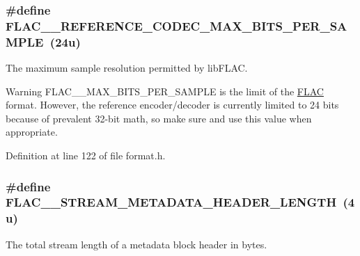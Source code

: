\subsubsection[{\texorpdfstring{F\+L\+A\+C\+\_\+\+\_\+\+R\+E\+F\+E\+R\+E\+N\+C\+E\+\_\+\+C\+O\+D\+E\+C\+\_\+\+M\+A\+X\+\_\+\+B\+I\+T\+S\+\_\+\+P\+E\+R\+\_\+\+S\+A\+M\+P\+LE}{FLAC__REFERENCE_CODEC_MAX_BITS_PER_SAMPLE}}]{\setlength{\rightskip}{0pt plus 5cm}\#define F\+L\+A\+C\+\_\+\+\_\+\+R\+E\+F\+E\+R\+E\+N\+C\+E\+\_\+\+C\+O\+D\+E\+C\+\_\+\+M\+A\+X\+\_\+\+B\+I\+T\+S\+\_\+\+P\+E\+R\+\_\+\+S\+A\+M\+P\+LE~(24u)}\hypertarget{group__flac__format_ga0fc418d96053d385fd2f56dce8007fbc}{}\label{group__flac__format_ga0fc418d96053d385fd2f56dce8007fbc}
The maximum sample resolution permitted by lib\+F\+L\+AC.

\begin{DoxyWarning}{Warning}
F\+L\+A\+C\+\_\+\+\_\+\+M\+A\+X\+\_\+\+B\+I\+T\+S\+\_\+\+P\+E\+R\+\_\+\+S\+A\+M\+P\+LE is the limit of the \hyperlink{namespace_f_l_a_c}{F\+L\+AC} format. However, the reference encoder/decoder is currently limited to 24 bits because of prevalent 32-\/bit math, so make sure and use this value when appropriate. 
\end{DoxyWarning}


Definition at line 122 of file format.\+h.

\subsubsection[{\texorpdfstring{F\+L\+A\+C\+\_\+\+\_\+\+S\+T\+R\+E\+A\+M\+\_\+\+M\+E\+T\+A\+D\+A\+T\+A\+\_\+\+H\+E\+A\+D\+E\+R\+\_\+\+L\+E\+N\+G\+TH}{FLAC__STREAM_METADATA_HEADER_LENGTH}}]{\setlength{\rightskip}{0pt plus 5cm}\#define F\+L\+A\+C\+\_\+\+\_\+\+S\+T\+R\+E\+A\+M\+\_\+\+M\+E\+T\+A\+D\+A\+T\+A\+\_\+\+H\+E\+A\+D\+E\+R\+\_\+\+L\+E\+N\+G\+TH~(4u)}\hypertarget{group__flac__format_ga706a29b8a14902c457783bfd4fd7bab2}{}\label{group__flac__format_ga706a29b8a14902c457783bfd4fd7bab2}
The total stream length of a metadata block header in bytes. 

